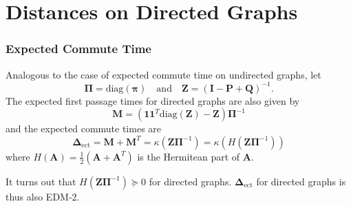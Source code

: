 \documentclass[professionalfonts, hyperref={pdfpagelabels=false,
  colorlinks=true, linkcolor=purple}]{beamer}
\begin{document}
\section{Distances on Directed Graphs}
\begin{frame}
  \frametitle{Expected Commute Time}
  Analogous to the case of expected commute time on undirected graphs,
  let 
  \begin{equation*}
    \bm{\Pi} = \mathrm{diag}(\bm{\pi}) \quad \text{and} \quad
    \mathbf{Z} = (\mathbf{I} - \mathbf{P} + \mathbf{Q})^{-1}.
  \end{equation*}
  The expected first passage times for directed graphs are also given by
  \begin{equation*}
    \mathbf{M} = (\mathbf{1}\mathbf{1}^{T}\mathrm{diag}(\mathbf{Z}) -
    \mathbf{Z})\bm{\Pi}^{-1} 
  \end{equation*}
  and the expected commute times are
  \begin{equation*}
    \bm{\Delta}_{\mathrm{ect}} = \mathbf{M} + \mathbf{M}^{T} =
    \kappa(\mathbf{Z}\bm{\Pi}^{-1}) =
    \kappa(H(\mathbf{Z}\bm{\Pi}^{-1}))
  \end{equation*}
  where $H(\mathbf{A}) = \tfrac{1}{2}(\mathbf{A} + \mathbf{A}^{T})$ is
  the Hermitean part of $\mathbf{A}$.
\begin{alertblock}{}
  It turns out that $H(\mathbf{Z}\bm{\Pi}^{-1}) \succeq 0$ for
  directed graphs. $\bm{\Delta}_{\mathrm{ect}}$ for directed graphs is
  thus also EDM-2.
\end{alertblock}
\end{frame}

\end{document}
